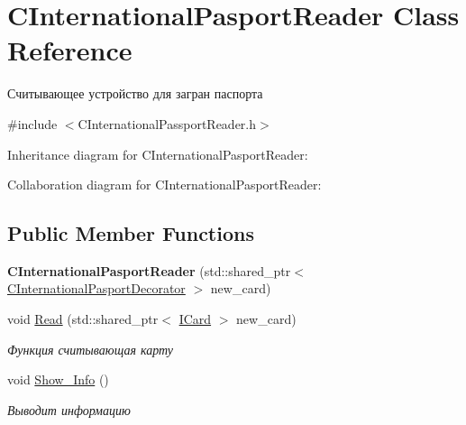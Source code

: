 \hypertarget{classCInternationalPasportReader}{}\section{C\+International\+Pasport\+Reader Class Reference}
\label{classCInternationalPasportReader}


Считывающее устройство для загран паспорта  




{\ttfamily \#include $<$C\+International\+Passport\+Reader.\+h$>$}



Inheritance diagram for C\+International\+Pasport\+Reader\+:


Collaboration diagram for C\+International\+Pasport\+Reader\+:
\subsection*{Public Member Functions}
\begin{DoxyCompactItemize}
\item 
{\bfseries C\+International\+Pasport\+Reader} (std\+::shared\+\_\+ptr$<$ \hyperlink{classCInternationalPasportDecorator}{C\+International\+Pasport\+Decorator} $>$ new\+\_\+card)\hypertarget{classCInternationalPasportReader_a2a7ecf5fc872cc15c8e4152585a15ffb}{}\label{classCInternationalPasportReader_a2a7ecf5fc872cc15c8e4152585a15ffb}

\item 
void \hyperlink{classCInternationalPasportReader_a7111beb4c783cb3f9bf7d1a072c12a2f}{Read} (std\+::shared\+\_\+ptr$<$ \hyperlink{classICard}{I\+Card} $>$ new\+\_\+card)
\begin{DoxyCompactList}\small\item\em Функция считывающая карту \end{DoxyCompactList}\item 
void \hyperlink{classCInternationalPasportReader_a5ef3723d80d06111bedaa85214bff2df}{Show\+\_\+\+Info} ()\hypertarget{classCInternationalPasportReader_a5ef3723d80d06111bedaa85214bff2df}{}\label{classCInternationalPasportReader_a5ef3723d80d06111bedaa85214bff2df}

\begin{DoxyCompactList}\small\item\em Выводит информацию \end{DoxyCompactList}\end{DoxyCompactItemize}


